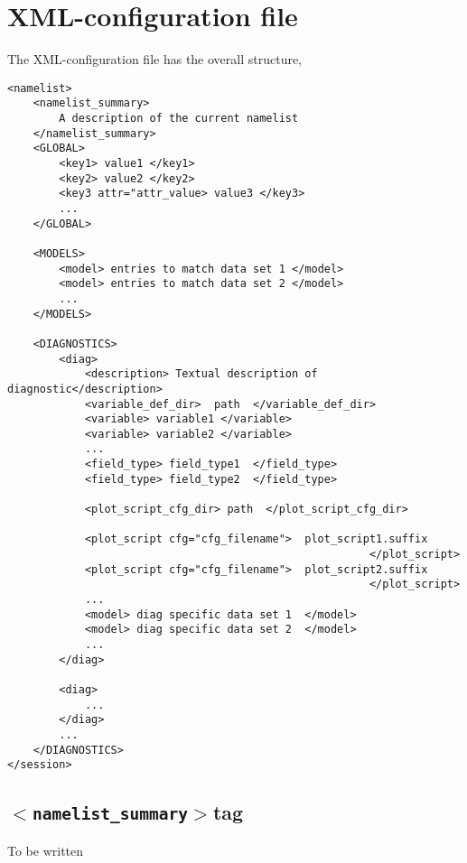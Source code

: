\documentclass[12pt]{article}
\newcommand{\xmltag}[1]{\texttt{$<$#1$>$}}
\begin{document}
\maketitle
\clearpage
\tableofcontents
\clearpage


% 
% 
\section{XML-configuration file}\label{section:XML_configuration_file}
The XML-configuration file has the overall structure, 
\begin{Verbatim}[frame=single, fontsize=\footnotesize]
<namelist>
    <namelist_summary>
        A description of the current namelist
    </namelist_summary>
    <GLOBAL>
        <key1> value1 </key1>
        <key2> value2 </key2>
        <key3 attr="attr_value> value3 </key3>
        ...
    </GLOBAL>

    <MODELS>
        <model> entries to match data set 1 </model>
        <model> entries to match data set 2 </model>
        ...
    </MODELS>

    <DIAGNOSTICS>
        <diag>
            <description> Textual description of diagnostic</description>
            <variable_def_dir>  path  </variable_def_dir>
            <variable> variable1 </variable>
            <variable> variable2 </variable>
            ...
            <field_type> field_type1  </field_type>
            <field_type> field_type2  </field_type>

            <plot_script_cfg_dir> path  </plot_script_cfg_dir>

            <plot_script cfg="cfg_filename">  plot_script1.suffix  
                                                        </plot_script>
            <plot_script cfg="cfg_filename">  plot_script2.suffix
                                                        </plot_script>
            ...
            <model> diag specific data set 1  </model>
            <model> diag specific data set 2  </model>
            ...
        </diag>

        <diag>
            ...
        </diag>
        ...
    </DIAGNOSTICS>
</session>
\end{Verbatim}
\normalsize


\subsection{\texorpdfstring{\xmltag{namelist\_summary}}-tag}
To be written
\end{document}
